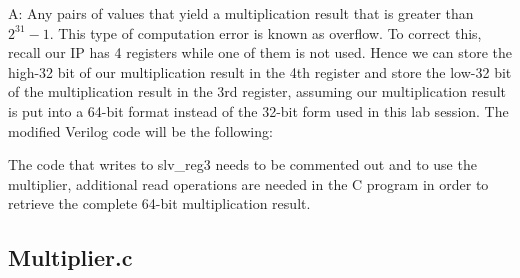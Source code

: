 \documentclass[11pt,letterpaper,titlepage]{article}
\begin{document}
A: Any pairs of values that yield a multiplication result that is greater than $2^31-1$. This type of computation error is known as overflow. To correct this, recall our IP has 4 registers while one of them is not used. Hence we can store the high-32 bit of our multiplication result in the 4th register and store the low-32 bit of the multiplication result in the 3rd register, assuming our multiplication result is put into a 64-bit format instead of the 32-bit form used in this lab session. The modified Verilog code will be the following:



The code that writes to slv\_reg3 needs to be commented out and to use the multiplier, additional read operations are needed in the C program in order to retrieve the complete 64-bit multiplication result.


\newpage

\begin{appendices}

\section{Multiplier.c}
\label{appendix:multiplier_c}


\end{appendices}
\end{document}
